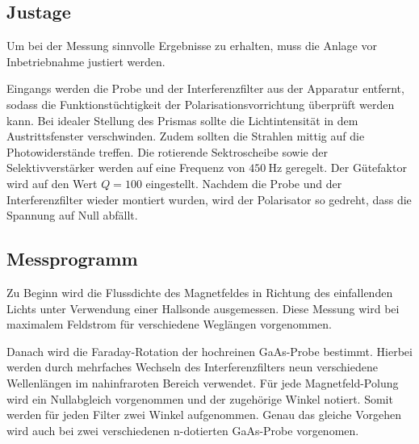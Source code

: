 \subsection{Justage}
Um bei der Messung sinnvolle Ergebnisse zu erhalten, muss die Anlage vor Inbetriebnahme justiert werden. 

\noindent
Eingangs werden die Probe und der Interferenzfilter aus der Apparatur entfernt, sodass die Funktionstüchtigkeit der
Polarisationsvorrichtung überprüft werden kann. Bei idealer Stellung des Prismas sollte die Lichtintensität in dem 
Austrittsfenster verschwinden. Zudem sollten die Strahlen mittig auf die Photowiderstände treffen. 
Die rotierende Sektroscheibe sowie der Selektivverstärker werden auf eine Frequenz von $\SI{450}{\hertz}$ geregelt. 
Der Gütefaktor wird auf den Wert $Q=\num{100}$ eingestellt. 
Nachdem die Probe und der Interferenzfilter wieder montiert wurden, wird der Polarisator so gedreht, dass die Spannung auf Null
abfällt. 

\subsection{Messprogramm}
Zu Beginn wird die Flussdichte des Magnetfeldes in Richtung des einfallenden Lichts unter Verwendung einer Hallsonde ausgemessen.
Diese Messung wird bei maximalem Feldstrom für verschiedene Weglängen vorgenommen.

\noindent
Danach wird die Faraday-Rotation der hochreinen GaAs-Probe bestimmt. Hierbei werden durch mehrfaches Wechseln des Interferenzfilters 
neun verschiedene Wellenlängen im nahinfraroten Bereich verwendet. Für jede Magnetfeld-Polung wird ein Nullabgleich vorgenommen 
und der zugehörige Winkel notiert. Somit werden für jeden Filter zwei Winkel aufgenommen. Genau das gleiche Vorgehen wird auch bei
zwei verschiedenen n-dotierten GaAs-Probe vorgenomen.
